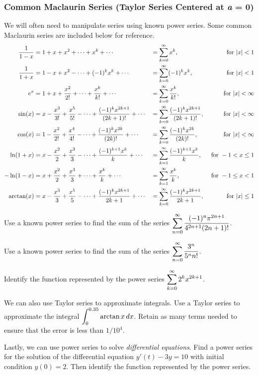 \documentclass[12pt]{article}
\begin{document}
\subsubsection*{Common Maclaurin Series (Taylor Series Centered at \textit{a} = 0)}
We will often need to manipulate series using known power series. Some common Maclaurin series are included below for reference.
\begin{alignat*}{3}
\dfrac{1}{1-x} &= 1+x+x^2+\cdots + x^k+\cdots & &= \displaystyle\sum_{k=0}^\infty x^k, & \text{ for }|x|<1\\
\dfrac{1}{1+x} &= 1-x+x^2-\cdots+(-1)^kx^k+\cdots & &= \displaystyle\sum_{k=0}^\infty(-1)^kx^k, & \text{ for }|x|<1\\
e^x &= 1+x+\dfrac{x^2}{2!}+\cdots+\dfrac{x^k}{k!}+\cdots & &= \displaystyle\sum_{k=0}^\infty\dfrac{x^k}{k!}, & \text{ for }|x|<\infty\\
\sin(x) &= x-\dfrac{x^3}{3!}+\dfrac{x^5}{5!}-\cdots+\dfrac{(-1)^k x^{2k+1}}{(2k+1)!}+\cdots  & &= \displaystyle\sum_{k=0}^\infty\dfrac{(-1)^kx^{2k+1}}{(2k+1)!}, & \text{ for } |x|<\infty\\
\cos(x) &= 1-\dfrac{x^2}{2!}+\dfrac{x^4}{4!}-\cdots +\dfrac{(-1)^k x^{2k}}{(2k)!}+\cdots & &= \displaystyle\sum_{k=0}^\infty\dfrac{(-1)^{k}x^{2k}}{(2k)!}, & \text{ for }|x|<\infty\\
\ln(1+x) &= x-\dfrac{x^2}{2}+\dfrac{x^3}{3}-\cdots+\dfrac{(-1)^{k+1}x^k}{k}+\cdots & &= \displaystyle\sum_{k=1}^\infty\dfrac{(-1)^{k+1}x^k}{k}, & \text{ for }-1< x\leq 1\\
-\ln(1-x) &= x+\dfrac{x^2}{2}+\dfrac{x^3}{3}+\cdots+\dfrac{x^k}{k}+\cdots & &= \displaystyle\sum_{k=1}^\infty\dfrac{x^k}{k}, & \text{ for }-1\leq x < 1\\
\arctan(x) &= x-\dfrac{x^3}{3}+\dfrac{x^5}{5}-\cdots +\dfrac{(-1)^kx^{2k+1}}{2k+1}+\cdots & &= \displaystyle\sum_{k=0}^\infty\dfrac{(-1)^kx^{2k+1}}{2k+1}, & \text{ for }|x|\leq 1\\
\end{alignat*}

\Example Use a known power series to find the sum of the series $\displaystyle\sum_{n=0}^\infty\dfrac{(-1)^n\pi^{2n+1}}{4^{2n+1}(2n+1)!}$.

\vfill

\Example Use a known power series to find the sum of the series $\displaystyle\sum_{n=0}^\infty\dfrac{3^n}{5^n n!}$.

\vfill

\newpage

\Example Identify the function represented by the power series $\displaystyle\sum_{k=0}^\infty 2^k x^{2k+1}$.

\vfill

\Example We can also use Taylor series to approximate integrals. Use a Taylor series to approximate the integral $\displaystyle\int_{0}^{0.35}\arctan x\,dx$. Retain as many terms needed to ensure that the error is less than $1/10^4$.

\vfill
\vfill
\vfill

\newpage

\Example Lastly, we can use power series to solve \textit{differential equations}. Find a power series for the solution of the differential equation $y'(t)-3y=10$ with initial condition $y(0)=2$. Then identify the function represented by the power series.
\end{document}
